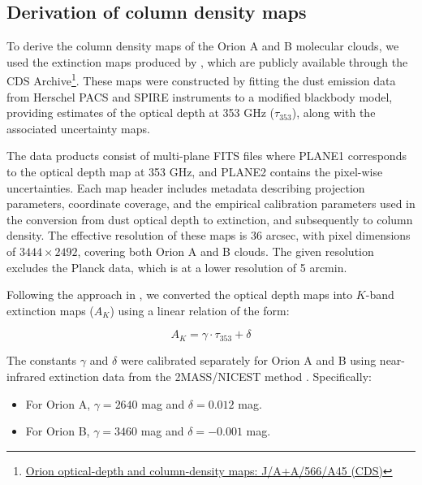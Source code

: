 \subsection{Derivation of column density maps}

To derive the column density maps of the Orion A and B molecular clouds, we used the extinction maps produced by \cite{lombardi2014herschel}, which are publicly available through the CDS Archive\footnote{\href{https://cdsarc.cds.unistra.fr/viz-bin/cat/J/A+A/566/A45\#/browse}{Orion optical-depth and column-density maps: J/A+A/566/A45 (CDS)}}. 
These maps were constructed by fitting the dust emission data from Herschel PACS and SPIRE instruments to a modified blackbody model, providing estimates of the optical depth at 353 GHz ($\tau_{353}$), along with the associated uncertainty maps.

The data products consist of multi-plane FITS files where PLANE1 corresponds to the optical depth map at 353 GHz, and PLANE2 contains the pixel-wise uncertainties. Each map header includes metadata describing projection parameters, coordinate coverage, and the empirical calibration parameters used in the conversion from dust optical depth to extinction, and subsequently to column density. The effective resolution of these maps is 36 arcsec, with pixel dimensions of $3444 \times 2492$, covering both Orion A and B clouds. The given resolution excludes the Planck data, which is at a lower resolution of 5 arcmin.

Following the approach in \cite{lombardi2014herschel}, we converted the optical depth maps into $K$-band extinction maps ($A_K$) using a linear relation of the form:

\begin{equation}
    A_K = \gamma \cdot \tau_{353} + \delta
    \label{eq:ak_tau_relation}
\end{equation}

The constants $\gamma$ and $\delta$ were calibrated separately for Orion A and B using near-infrared extinction data from the 2MASS/NICEST method \cite{lombardi2009nicest}. Specifically:
\begin{itemize}
    \item For Orion A, $\gamma = 2640$ mag and $\delta = 0.012$ mag.
    \item For Orion B, $\gamma = 3460$ mag and $\delta = -0.001$ mag.
\end{itemize}

